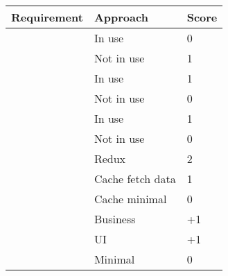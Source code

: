\begin{table}[h]
      \centering
      \begin{tabular}{|l|l|l|}
            \hline
            \textbf{Requirement} &
            \textbf{Approach}    &
            \textbf{Score}
            \\ \hline
            \multirow{2}{*}{\nameref{cha:requirement_detail_integration_pagelayout}}
                                 & In use                                    & 0                             \\ \cline{2-3}
                                 & Not in use                                & 1                             \\ \hline
            \multirow{2}{*}{\nameref{cha:requirement_detail_integration_widget}}
                                 & In use                                    & 1                             \\ \cline{2-3}
                                 & Not in use                                & 0                             \\ \hline
            \multirow{2}{*}{\nameref{cha:requirement_detail_integration_abstraction}}
                                 & In use                                    & 1                             \\ \cline{2-3}
                                 & Not in use                                & 0                             \\ \hline
            \multirow{3}{*}{\nameref{cha:requirement_detail_state_exchange}}
                                 & Redux                                     & 2                             \\ \cline{2-3}
                                 & Cache fetch data                          & 1                             \\ \cline{2-3}
                                 & Cache minimal                             & 0                             \\ \hline
            \multirow{3}{*}{\nameref{cha:requirement_detail_integration_sharedlogic}}
                                 & Business                                  & +1                            \\ \cline{2-3}
                                 & \ac{UI}                                   & +1                            \\ \cline{2-3}
                                 & Minimal                                   & 0                             \\ \hline

\end{tabular}
\end{table}

